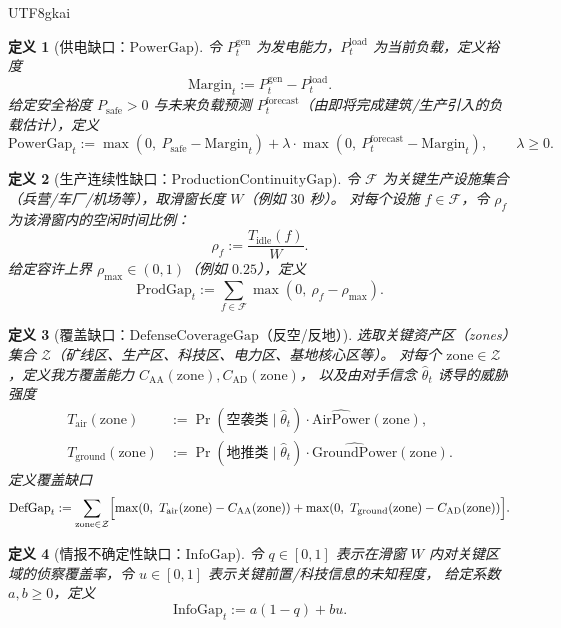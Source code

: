 \documentclass[12pt]{article}
\newtheorem{definition}{定义}[section]
\begin{document}
\begin{CJK*}{UTF8}{gkai}
\begin{definition}[供电缺口：$\mathrm{PowerGap}$]
\label{def:openra-gap-power}
令 $P^{\mathrm{gen}}_t$ 为发电能力，$P^{\mathrm{load}}_t$ 为当前负载，定义裕度
\[
  \mathrm{Margin}_t := P^{\mathrm{gen}}_t - P^{\mathrm{load}}_t.
\]
给定安全裕度 $P_{\mathrm{safe}}>0$ 与未来负载预测 $P^{\mathrm{forecast}}_t$（由即将完成建筑/生产引入的负载估计），定义
\[
  \mathrm{PowerGap}_t
  :=
  \max(0,\ P_{\mathrm{safe}}-\mathrm{Margin}_t)
  +
  \lambda\cdot \max(0,\ P^{\mathrm{forecast}}_t-\mathrm{Margin}_t),
  \qquad \lambda\ge 0.
\]
\end{definition}

\begin{definition}[生产连续性缺口：$\mathrm{ProductionContinuityGap}$]
\label{def:openra-gap-production}
令 $\mathcal{F}$ 为关键生产设施集合（兵营/车厂/机场等），取滑窗长度 $W$（例如 $30$ 秒）。
对每个设施 $f\in\mathcal{F}$，令 $\rho_f$ 为该滑窗内的空闲时间比例：
\[
  \rho_f := \frac{T_{\mathrm{idle}}(f)}{W}.
\]
给定容许上界 $\rho_{\max}\in(0,1)$（例如 $0.25$），定义
\[
  \mathrm{ProdGap}_t := \sum_{f\in\mathcal{F}} \max(0,\ \rho_f-\rho_{\max}).
\]
\end{definition}

\begin{definition}[覆盖缺口：$\mathrm{DefenseCoverageGap}$（反空/反地）]
\label{def:openra-gap-defense-coverage}
选取关键资产区（zones）集合 $\mathcal{Z}$（矿线区、生产区、科技区、电力区、基地核心区等）。
对每个 $\mathrm{zone}\in\mathcal{Z}$，定义我方覆盖能力 $C_{\mathrm{AA}}(\mathrm{zone}),C_{\mathrm{AD}}(\mathrm{zone})$，
以及由对手信念 $\widehat{\theta}_t$ 诱导的威胁强度
\[
  \begin{aligned}
    T_{\mathrm{air}}(\mathrm{zone})
    &:=
    \Pr(\text{空袭类}\mid \widehat{\theta}_t)\cdot \widehat{\mathrm{AirPower}}(\mathrm{zone}),\\
    T_{\mathrm{ground}}(\mathrm{zone})
    &:=
    \Pr(\text{地推类}\mid \widehat{\theta}_t)\cdot \widehat{\mathrm{GroundPower}}(\mathrm{zone}).
  \end{aligned}
\]
定义覆盖缺口
\[
  \mathrm{DefGap}_t
  :=
  \sum_{\mathrm{zone}\in\mathcal{Z}}
  \Bigl[
    \max(0,\ T_{\mathrm{air}}(\mathrm{zone})-C_{\mathrm{AA}}(\mathrm{zone}))
    +
    \max(0,\ T_{\mathrm{ground}}(\mathrm{zone})-C_{\mathrm{AD}}(\mathrm{zone}))
  \Bigr].
\]
\end{definition}

\begin{definition}[情报不确定性缺口：$\mathrm{InfoGap}$]
\label{def:openra-gap-info}
令 $q\in[0,1]$ 表示在滑窗 $W$ 内对关键区域的侦察覆盖率，令 $u\in[0,1]$ 表示关键前置/科技信息的未知程度，
给定系数 $a,b\ge 0$，定义
\[
  \mathrm{InfoGap}_t := a(1-q)+bu.
\]
\end{definition}


\end{CJK*}
\end{document}
